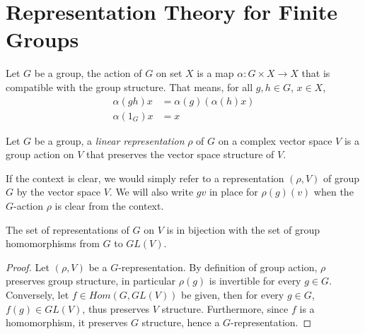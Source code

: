 
\section{Representation Theory for Finite Groups}

\begin{defn}
  Let $G$ be a group, the action of $G$ on set $X$ is a map $\alpha : G \times X
  \to X$ that is compatible with the group structure.  That means, for all $g,h
  \in G$, $x \in X$,
  \begin{align*}
    \alpha(gh)x & = \alpha(g)(\alpha(h)x)\\
    \alpha(1_G)x & = x
  \end{align*}
\end{defn}

\begin{defn}
  Let $G$ be a group, a \emph{linear representation} $\rho$ of $G$ on a complex
  vector space $V$ is a group action on $V$ that preserves the vector space
  structure of $V$.
\end{defn}

If the context is clear, we would simply refer to a representation $(\rho, V)$
of group $G$ by the vector space $V$.  We will also write $gv$ in place for
$\rho(g)(v)$ when the $G$-action $\rho$ is clear from the context.

\begin{prop}
  The set of representations of $G$ on $V$ is in bijection with the set of group
  homomorphisms from $G$ to $GL(V)$.
\end{prop}

\begin{proof}
  Let $(\rho, V)$ be a $G$-representation.  By definition of group action,
  $\rho$ preserves group structure, in particular $\rho(g)$ is invertible for
  every $g \in G$. Conversely, let $f \in Hom(G,GL(V))$ be given, then for every
  $g \in G$, $f(g) \in GL(V)$, thus preserves $V$ structure.  Furthermore, since
  $f$ is a homomorphism, it preserves $G$ structure, hence a $G$-representation.
\end{proof}

